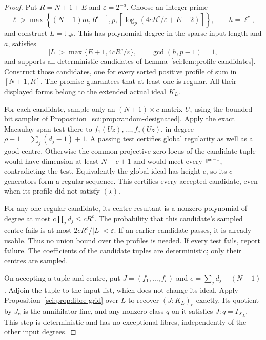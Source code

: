 \begin{proof}
Put \(R=N+1+E\) and \(\varepsilon=2^{-a}\). Choose an integer prime
\[
 \ell>\max\!\left\{(N+1)m,R^{c-1},p,
 \left\lceil\log_p(4cR^c/\varepsilon+E+2)\right\rceil\right\},
 \qquad h=\ell^c,
\]
and construct \(L=\mathbb F_{p^h}\). This has polynomial degree in
the sparse input length and \(a\), satisfies
\[
 |L|>\max\{E+1,4cR^c/\varepsilon\},
 \qquad \gcd(h,p-1)=1,
\]
and supports all deterministic candidates of
Lemma~\ref{sci:lem:profile-candidates}. Construct those candidates,
one for every sorted positive profile of sum in \([N+1,R]\).
The promise guarantees that at least one is regular. All their displayed
forms belong to the extended actual ideal \(K_L\).

For each candidate, sample only an \((N+1)\times c\) matrix \(U\),
using the bounded-bit sampler of
Proposition~\ref{sci:prop:random-designated}. Apply the exact
Macaulay span test there to \(f_1(Uz),\ldots,f_c(Uz)\), in degree
\(\rho+1=\sum_j(d_j-1)+1\). A passing test certifies global
regularity as well as a good centre. Otherwise the common projective
zero locus of the candidate tuple would have dimension at least
\(N-c+1\) and would meet every \(\mathbb P^{c-1}\), contradicting the
test. Equivalently the global ideal has height \(c\), so its \(c\)
generators form a regular sequence. This certifies every accepted
candidate, even when its profile did not satisfy \((\star)\).

For any one regular candidate, its centre resultant is a nonzero
polynomial of degree at most \(c\prod_jd_j\leq cR^c\). The probability
that this candidate's sampled centre fails is at most
\(2cR^c/|L|<\varepsilon\). If an earlier candidate passes, it is
already usable. Thus no union bound over the profiles is needed.
If every test fails, report failure. The coefficients of the candidate
tuples are deterministic; only their centres are sampled.

On accepting a tuple and centre, put
\(J=(f_1,\ldots,f_c)\) and \(e=\sum_jd_j-(N+1)\).
Adjoin the tuple to the input list, which does not change its ideal.
Apply Proposition~\ref{sci:prop:fibre-grid} over \(L\) to recover
\((J:K_L)_e\) exactly. Its quotient by \(J_e\) is the annihilator
line, and any nonzero class \(q\) on it satisfies \(J:q=I_{X_L}\).
This step is deterministic and has no exceptional fibres, independently
of the other input degrees.


\end{proof}
